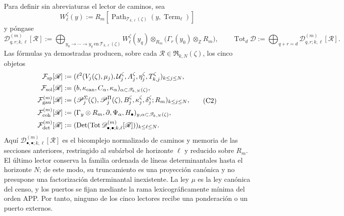 Para definir sin abreviaturas el lector de caminos, sea
\[
 W_\ell^\zeta(y):=
 R_m[\operatorname{Path}_{\mathscr T_{k,\ell}(\zeta)}
          (y,\operatorname{Term}_\ell)]
\]
y póngase
\[
 \mathscr D_{q,r;k,\ell}^{(m)}[\mathscr R]
 :=\bigoplus_{y_0\to\cdots\to y_q\ \text{en}\
                  \mathscr T_{k,\ell}(\zeta)}
 W_\ell^\zeta(y_q)\otimes_{R_m}
 \bigl(\Gamma_r(y_0)\otimes_{\mathbb Z}R_m\bigr),
 \qquad
 \operatorname{Tot}_d\mathscr D
 :=\bigoplus_{q+r=d}\mathscr D_{q,r;k,\ell}^{(m)}[\mathscr R].
\]
Las fórmulas ya demostradas producen, sobre cada
\(\mathscr R\in\mathfrak R_{k,N}(\zeta)\), los cinco objetos
\[
\begin{aligned}
 \mathcal F_{\rm sp}[\mathscr R]
 &:=(\ell^2(V_j(\zeta),\mu_j),
       \mathcal U_j^\zeta,A_j^\zeta,\eta_j^\zeta,
       T_{k,j}^\zeta)_{k\leq j\leq N},\\
 \mathcal F_{\rm sol}[\mathscr R]
 &:=(b,\kappa_{\rm can},C_\alpha,\kappa_\alpha)
      _{\alpha\subset\mathscr T_{k,N}(\zeta)},\\
 \mathcal F_{\rm gau}^{(m)}[\mathscr R]
 &:=(\mathscr P_j^\Sigma(\zeta),\mathscr P_j^\Pi(\zeta),
       B_j^\zeta,\kappa_j^\zeta,\delta_j^\zeta;R_m)_{k\leq j\leq N},\\
 \mathcal F_{\rm coh}^{(m)}[\mathscr R]
 &:=(\Gamma_y\otimes R_m,\partial,\Psi_\alpha,H_\bullet)
      _{y,\alpha\subset\mathscr T_{k,N}(\zeta)},\\
 \mathcal F_{\rm det}^{(m)}[\mathscr R]
 &:=(\operatorname{Det}(\operatorname{Tot}
       \mathscr D_{\bullet,\bullet;k,\ell}^{(m)}[\mathscr R]))
       _{k\leq\ell\leq N}.
\end{aligned}
\tag{C2}
\label{ix:eq:cinco-lectores-comunes}
\]
Aquí \(\mathscr D_{\bullet,\bullet;k,\ell}^{(m)}[\mathscr R]\) es el
bicomplejo normalizado
de caminos y memoria de las secciones anteriores, restringido al subárbol de
horizonte \(\ell\) y reducido sobre \(R_m\). El último lector conserva la
familia ordenada de líneas determinantales hasta el horizonte \(N\); de este
modo, su truncamiento es una proyección canónica y no presupone una
factorización determinantal inexistente. La ley \(\mu\) es la ley canónica
del censo, y los puertos se fijan mediante la rama lexicográficamente mínima
del orden APP. Por tanto, ninguno de los cinco lectores recibe una ponderación
o un puerto externos.

